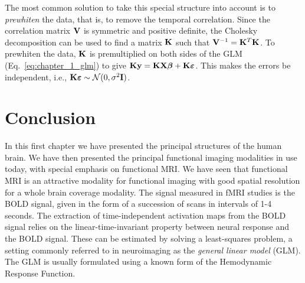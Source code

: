 The most common solution to take this special structure into account is to \emph{prewhiten} the data, that is, to remove the temporal correlation. Since the correlation matrix $\mathbf{V}$ is symmetric and positive definite, the Cholesky decomposition can be used to find a matrix $\mathbf{K}$ such that $\mathbf{V}^{-1} = \mathbf{K}^T \mathbf{K}$. To prewhiten the data, $\mathbf{K}$ is premultiplied on both sides of the GLM (Eq.~\eqref{eq:chapter_1_glm}) to give $\mathbf{K}\mathbf{y} = \mathbf{K}\mathbf{X} {\boldsymbol \beta} + \mathbf{K}{\boldsymbol \varepsilon}$. This makes the errors be independent, i.e., $\mathbf{K}{\boldsymbol \varepsilon} \sim \mathcal{N}(0, \sigma^2 \mathbf{I})$.


\section{Conclusion}
In this first chapter we have presented the principal structures of the human brain. We have then presented the principal functional imaging modalities in use today, with special emphasis on functional MRI. We have seen that functional MRI is an attractive modality for functional imaging with good spatial resolution for a whole brain coverage modality. The signal measured in fMRI studies is the BOLD signal, given in the form of a succession of scans in intervals of 1-4 seconds. The extraction of time-independent activation maps from the BOLD signal relies on the linear-time-invariant property between neural response and the BOLD signal. These can be estimated by solving a least-squares problem, a setting commonly referred to in neuroimaging as the \emph{general linear model} (GLM). The GLM is usually formulated using a known form of the Hemodynamic Response Function.

\newpage

\begin{fullwidth}


\end{fullwidth}





